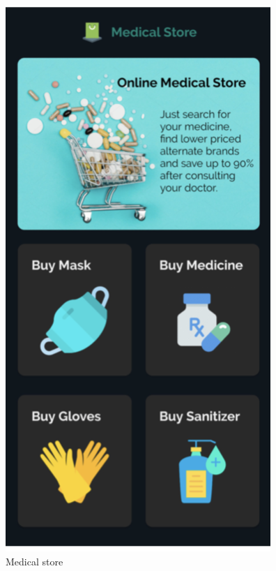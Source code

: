 \begin{center}
\includegraphics[scale=0.55]{store.png}\\[0.75cm]
\caption{Medical store}
\end{center}
